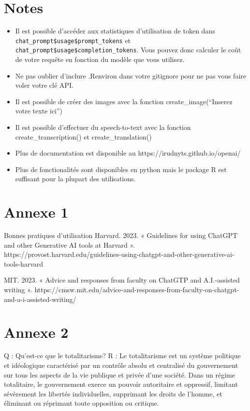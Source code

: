 \documentclass[
  letterpaper,
  DIV=11,
  numbers=noendperiod]{scrreprt}
\begin{document}
\hypertarget{notes}{%
\section{Notes}\label{notes}}

\begin{itemize}
\item
  Il est possible d'accéder aux statistiques d'utilisation de token dans
  \texttt{chat\_prompt\$usage\$prompt\_tokens} et
  \texttt{chat\_prompt\$usage\$completion\_tokens}. Vous pouvez donc
  calculer le coût de votre requête en fonction du modèle que vous
  utilisez.
\item
  Ne pas oublier d'inclure .Renviron dans votre gitignore pour ne pas
  vous faire voler votre clé API.
\item
  Il est possible de créer des images avec la fonction
  create\_image(``Inserez votre texte ici'')
\item
  Il est possible d'effectuer du speech-to-text avec la fonction
  create\_transcription() et create\_translation()
\item
  Plus de documentation est disponible au
  https://irudnyts.github.io/openai/
\item
  Plus de fonctionalités sont disponibles en python mais le package R
  est suffisant pour la plupart des utilisations.
\end{itemize}

\hypertarget{annexe-1}{%
\section{Annexe 1}\label{annexe-1}}

Bonnes pratiques d'utilisation Harvard. 2023. « Guidelines for using
ChatGPT and other Generative AI tools at Harvard ».
https://provost.harvard.edu/guidelines-using-chatgpt-and-other-generative-ai-tools-harvard

MIT. 2023. « Advice and responses from faculty on ChatGTP and
A.I.-assisted writing ».
https://cmsw.mit.edu/advice-and-responses-from-faculty-on-chatgpt-and-a-i-assisted-writing/

\hypertarget{annexe-2}{%
\section{Annexe 2}\label{annexe-2}}

Q : Qu'est-ce que le totalitarisme? R : Le totalitarisme est un système
politique et idéologique caractérisé par un contrôle absolu et
centralisé du gouvernement sur tous les aspects de la vie publique et
privée d'une société. Dans un régime totalitaire, le gouvernement exerce
un pouvoir autoritaire et oppressif, limitant sévèrement les libertés
individuelles, supprimant les droits de l'homme, et éliminant ou
réprimant toute opposition ou critique.
\end{document}
